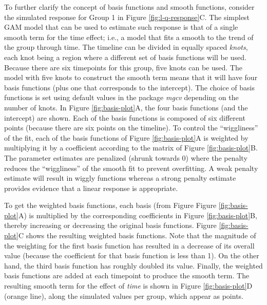 \documentclass[
]{article}
\begin{document}
To further clarify the concept of basis functions and smooth functions, consider the simulated response for Group 1 in Figure \ref{fig:l-q-response}C. The simplest GAM model that can be used to estimate such response is that of a single smooth term for the time effect; i.e., a model that fits a smooth to the trend of the group through time. The timeline can be divided in equally spaced \emph{knots}, each knot being a region where a different set of basis functions will be used. Because there are six timepoints for this group, five knots can be used. The model with five knots to construct the smooth term means that it will have four basis functions (plus one that corresponds to the intercept). The choice of basis functions is set using default values in the package \emph{mgcv} depending on the number of knots. In Figure \ref{fig:basis-plot}A, the four basis functions (and the intercept) are shown. Each of the basis functions is composed of six different points (because there are six points on the timeline). To control the ``wiggliness'' of the fit, each of the basis functions of Figure \ref{fig:basis-plot}A is weighted by multiplying it by a coefficient according to the matrix of Figure \ref{fig:basis-plot}B. The parameter estimates are penalized (shrunk towards 0) where the penalty reduces the ``wiggliness'' of the smooth fit to prevent overfitting. A weak penalty estimate will result in wiggly functions whereas a strong penalty estimate provides evidence that a linear response is appropriate.

To get the weighted basis functions, each basis (from Figure Figure \ref{fig:basis-plot}A) is multiplied by the corresponding coefficients in Figure \ref{fig:basis-plot}B, thereby increasing or decreasing the original basis functions. Figure \ref{fig:basis-plot}C shows the resulting weighted basis functions. Note that the magnitude of the weighting for the first basis function has resulted in a decrease of its overall value (because the coefficient for that basis function is less than 1). On the other hand, the third basis function has roughly doubled its value. Finally, the weighted basis functions are added at each timepoint to produce the smooth term. The resulting smooth term for the effect of \emph{time} is shown in Figure \ref{fig:basis-plot}D (orange line), along the simulated values per group, which appear as points.
\end{document}

